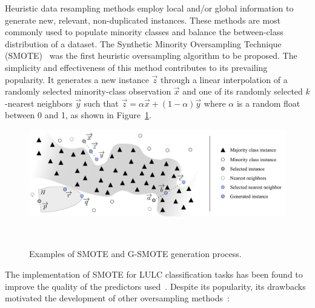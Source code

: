 \documentclass[parskip=full]{scrartcl}
\begin{document}
Heuristic data resampling methods employ local and/or global information to
generate new, relevant, non-duplicated instances. These methods are most
commonly used to populate minority classes and balance the between-class
distribution of a dataset. The Synthetic Minority Oversampling Technique
(SMOTE)~\cite{Chawla2002} was the first heuristic oversampling algorithm to be
proposed. The simplicity and effectiveness of this method contributes to its
prevailing popularity. It generates a new instance $\overrightarrow{z}$ through
a linear interpolation of a randomly selected minority-class observation
$\overrightarrow{x}$ and one of its randomly selected $k$-nearest neighbors
$\overrightarrow{y}$ such that $\overrightarrow{z} = \alpha\overrightarrow{x} +
(1-\alpha)\overrightarrow{y}$ where $\alpha$ is a random float between 0 and 1,
as shown in Figure~\ref{fig:data_generation}. 

\begin{figure}[H]
	\centering
	\includegraphics[width=\linewidth]{../analysis/data_generation}
	\caption{Examples of SMOTE and G-SMOTE generation process.
    }~\label{fig:data_generation}
\end{figure}

The implementation of SMOTE for LULC classification tasks has been found to
improve the quality of the predictors used~\cite{Jozdani2019,Bogner2018}.
Despite its popularity, its drawbacks motivated the development of other
oversampling methods~\cite{Douzas2019}:
\end{document}
